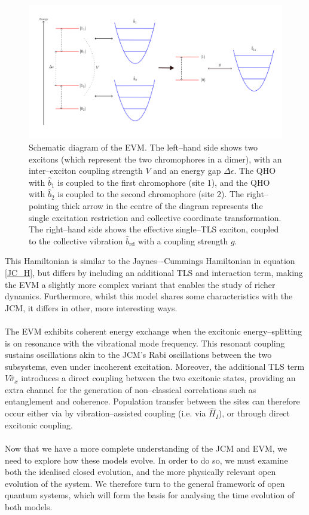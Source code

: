 \documentclass[11pt]{article}
\begin{document}
\begin{figure}[h]
    \centering
    \includegraphics[scale=0.7]{Images/EVM.png}
    \caption{Schematic diagram of the EVM. The left--hand side shows two excitons (which represent the two chromophores in a dimer), with an inter--exciton coupling strength $V$ and an energy gap $\Delta\epsilon$. The QHO with $\hat{b}_1$ is coupled to the first chromophore (site 1), and the QHO with $\hat{b}_2$ is coupled to the second chromophore (site 2). The right--pointing thick arrow in the centre of the diagram represents the single excitation restriction and collective coordinate transformation. The right--hand side shows the effective single--TLS exciton, coupled to the collective vibration $\hat{b}_{\scriptscriptstyle \text{rd}}$ with a coupling strength $g$.}
    \label{fig:img_EVM}
\end{figure}

\noindent This Hamiltonian is similar to the Jaynes–-Cummings Hamiltonian in equation \eqref{JC_H}, but differs by including an additional TLS and interaction term, making the EVM a slightly more complex variant that enables the study of richer dynamics. Furthermore, whilst this model shares some characteristics with the JCM, it differs in other, more interesting ways. \\
\\
The EVM exhibits coherent energy exchange when the excitonic energy--splitting is on resonance with the vibrational mode frequency. This resonant coupling sustains oscillations akin to the JCM's Rabi oscillations between the two subsystems, even under incoherent excitation. Moreover, the additional TLS term $V\hat{\sigma}_x$ introduces a direct coupling between the two excitonic states, providing an extra channel for the generation of non--classical correlations such as entanglement and coherence. Population transfer between the sites can therefore occur either via by vibration--assisted coupling (i.e. via $\hat{H}_I$), or through direct excitonic coupling.\\
\\
Now that we have a more complete understanding of the JCM and EVM, we need to explore how these models evolve. In order to do so, we must examine both the idealised closed evolution, and the more physically relevant open evolution of the system. We therefore turn to the general framework of open quantum systems, which will form the basis for analysing the time evolution of both models.
\end{document}
